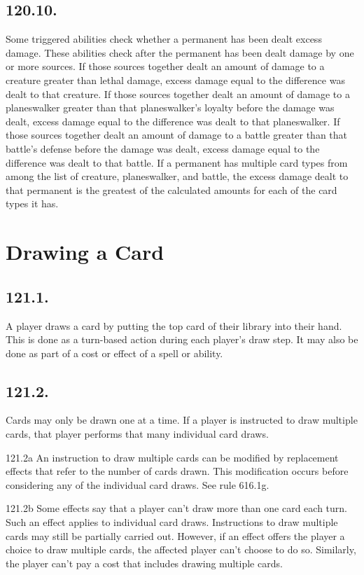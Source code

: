 \subsection*{120.10.}
Some triggered abilities check whether a permanent has been dealt excess damage. These abilities check after the permanent has been dealt damage by one or more sources. If those sources together dealt an amount of damage to a creature greater than lethal damage, excess damage equal to the difference was dealt to that creature. If those sources together dealt an amount of damage to a planeswalker greater than that planeswalker’s loyalty before the damage was dealt, excess damage equal to the difference was dealt to that planeswalker. If those sources together dealt an amount of damage to a battle greater than that battle’s defense before the damage was dealt, excess damage equal to the difference was dealt to that battle. If a permanent has multiple card types from among the list of creature, planeswalker, and battle, the excess damage dealt to that permanent is the greatest of the calculated amounts for each of the card types it has.

\section{Drawing a Card}
\subsection*{121.1.}
A player draws a card by putting the top card of their library into their hand. This is done as a turn-based action during each player’s draw step. It may also be done as part of a cost or effect of a spell or ability.

\subsection*{121.2.}
Cards may only be drawn one at a time. If a player is instructed to draw multiple cards, that player performs that many individual card draws.

121.2a An instruction to draw multiple cards can be modified by replacement effects that refer to the number of cards drawn. This modification occurs before considering any of the individual card draws. See rule 616.1g.

121.2b Some effects say that a player can’t draw more than one card each turn. Such an effect applies to individual card draws. Instructions to draw multiple cards may still be partially carried out. However, if an effect offers the player a choice to draw multiple cards, the affected player can’t choose to do so. Similarly, the player can’t pay a cost that includes drawing multiple cards.

